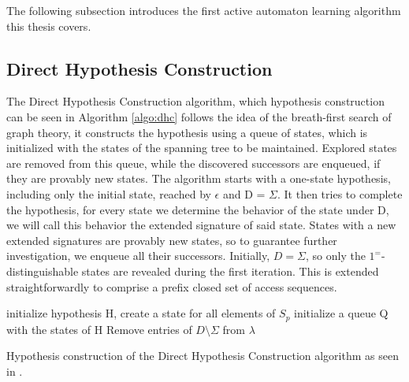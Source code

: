 The following subsection introduces the first active automaton learning algorithm this thesis covers.

\subsection{Direct Hypothesis Construction\cite{10.1007/978-3-642-34781-8_19}}
The Direct Hypothesis Construction algorithm, which hypothesis construction can be seen in Algorithm \ref{algo:dhc}  follows the idea of the breath-first search of graph theory, it constructs the hypothesis using a queue of states, which is initialized with the states of the spanning tree to be maintained. Explored states are removed from this queue, while the discovered successors are enqueued, if they are provably new states. The algorithm starts with a one-state hypothesis, including only the initial state, reached by $\epsilon$ and D = $\Sigma$. It then tries to complete the hypothesis, for every state we determine the behavior of the state under D, we will call this behavior the extended signature of said state. States with a new extended signatures are provably new states, so to guarantee further investigation, we enqueue all their successors. Initially, $D=\Sigma$, so only the $1^=$-distinguishable states are revealed during the first iteration. This is extended straightforwardly to comprise a prefix closed set of access sequences. \cite{Steffen2011}\cite{10.1007/978-3-642-34781-8_19}

\begin{algorithm}[H]
	\SetAlgoLined
	\DontPrintSemicolon
	initialize hypothesis H, create a state for all elements of $S_p$\;
	initialize a queue Q with the states of H\;
	Remove entries of $D\setminus\Sigma$ from $\lambda$\;
	\;
	\caption{Hypothesis construction of the Direct Hypothesis Construction algorithm as seen in \cite{Steffen2011}.}
	\label{algo:dhc}
\end{algorithm}

